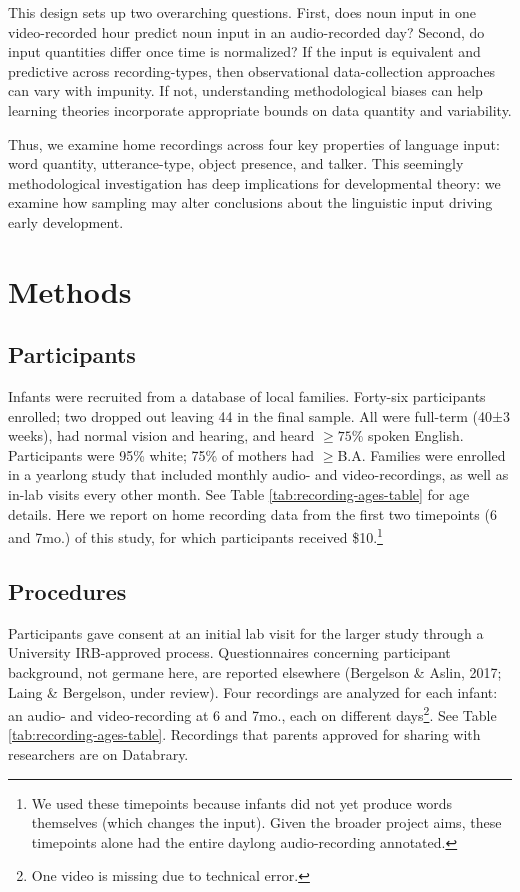 \documentclass[man]{apa6}
\theoremstyle{definition}
\theoremstyle{definition}
\theoremstyle{definition}
\theoremstyle{remark}
\begin{document}
This design sets up two overarching questions. First, does noun input in
one video-recorded hour predict noun input in an audio-recorded day?
Second, do input quantities differ once time is normalized? If the input
is equivalent and predictive across recording-types, then observational
data-collection approaches can vary with impunity. If not, understanding
methodological biases can help learning theories incorporate appropriate
bounds on data quantity and variability.

Thus, we examine home recordings across four key properties of language
input: word quantity, utterance-type, object presence, and talker. This
seemingly methodological investigation has deep implications for
developmental theory: we examine how sampling may alter conclusions
about the linguistic input driving early development.

\section{Methods}\label{methods}

\subsection{Participants}\label{participants}

Infants were recruited from a database of local families. Forty-six
participants enrolled; two dropped out leaving 44 in the final sample.
All were full-term (40±3 weeks), had normal vision and hearing, and
heard \(\geq 75\%\) spoken English. Participants were 95\% white; 75\%
of mothers had \(\geq\)B.A. Families were enrolled in a yearlong study
that included monthly audio- and video-recordings, as well as in-lab
visits every other month. See Table \ref{tab:recording-ages-table} for
age details. Here we report on home recording data from the first two
timepoints (6 and 7mo.) of this study, for which participants received
\$10.\footnote{We used these timepoints because infants did not yet produce words themselves (which changes the input). Given the broader project aims, these timepoints alone had the entire daylong audio-recording annotated.}

\subsection{Procedures}\label{procedures}

Participants gave consent at an initial lab visit for the larger study
through a University IRB-approved process. Questionnaires concerning
participant background, not germane here, are reported elsewhere
(Bergelson \& Aslin, 2017; Laing \& Bergelson, under review). Four
recordings are analyzed for each infant: an audio- and video-recording
at 6 and 7mo., each on different
days\footnote{One video is missing due to technical error.}. See Table
\ref{tab:recording-ages-table}. Recordings that parents approved for
sharing with researchers are on Databrary.
\end{document}
